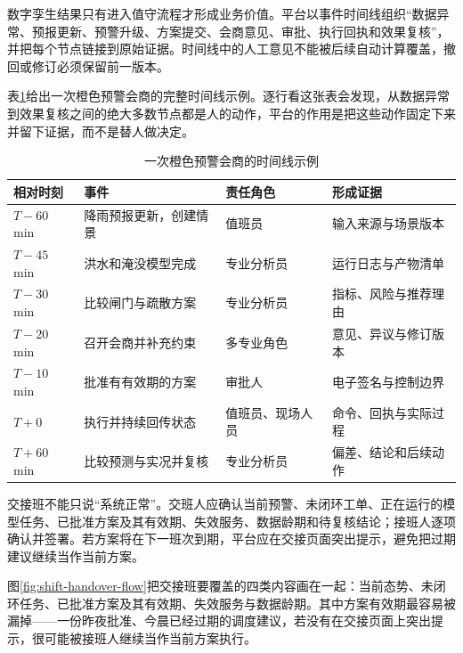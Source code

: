 数字孪生结果只有进入值守流程才形成业务价值。平台以事件时间线组织“数据异常、预报更新、预警升级、方案提交、会商意见、审批、执行回执和效果复核”，并把每个节点链接到原始证据。时间线中的人工意见不能被后续自动计算覆盖，撤回或修订必须保留前一版本。

表\ref{tab:consultation-timeline}给出一次橙色预警会商的完整时间线示例。逐行看这张表会发现，从数据异常到效果复核之间的绝大多数节点都是人的动作，平台的作用是把这些动作固定下来并留下证据，而不是替人做决定。

\begin{table}[htbp]
\centering
\caption{一次橙色预警会商的时间线示例}
\label{tab:consultation-timeline}
\begin{tabular}{p{2.0cm}p{3.5cm}p{4.2cm}p{3.2cm}}
\toprule
相对时刻 & 事件 & 责任角色 & 形成证据 \\
\midrule
$T-60$ min & 降雨预报更新，创建情景 & 值班员 & 输入来源与场景版本 \\
$T-45$ min & 洪水和淹没模型完成 & 专业分析员 & 运行日志与产物清单 \\
$T-30$ min & 比较闸门与疏散方案 & 专业分析员 & 指标、风险与推荐理由 \\
$T-20$ min & 召开会商并补充约束 & 多专业角色 & 意见、异议与修订版本 \\
$T-10$ min & 批准有有效期的方案 & 审批人 & 电子签名与控制边界 \\
$T+0$ & 执行并持续回传状态 & 值班员、现场人员 & 命令、回执与实际过程 \\
$T+60$ min & 比较预测与实况并复核 & 专业分析员 & 偏差、结论和后续动作 \\
\bottomrule
\end{tabular}
\end{table}

交接班不能只说“系统正常”。交班人应确认当前预警、未闭环工单、正在运行的模型任务、已批准方案及其有效期、失效服务、数据龄期和待复核结论；接班人逐项确认并签署。若方案将在下一班次到期，平台应在交接页面突出提示，避免把过期建议继续当作当前方案。

图\ref{fig:shift-handover-flow}把交接班要覆盖的四类内容画在一起：当前态势、未闭环任务、已批准方案及其有效期、失效服务与数据龄期。其中方案有效期最容易被漏掉——一份昨夜批准、今晨已经过期的调度建议，若没有在交接页面上突出提示，很可能被接班人继续当作当前方案执行。


